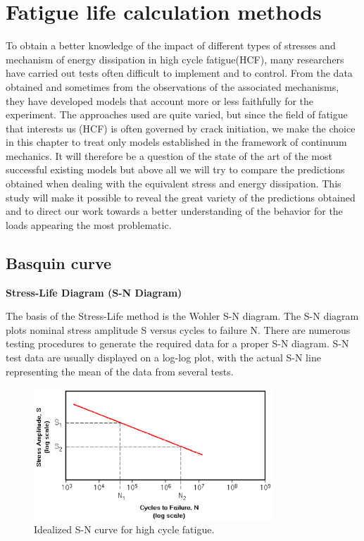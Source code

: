\chapter{Fatigue life calculation methods}\label{chp:2}
\minitoc

To obtain a better knowledge of the impact of different types of stresses and mechanism of energy dissipation in high cycle fatigue(HCF), many researchers have carried out tests often difficult to implement and to control. From the data obtained and sometimes from the observations of the associated mechanisms, they have developed models that account more or less faithfully for the experiment. The approaches used are quite varied, but since the field of fatigue that interests us (HCF) is often governed by crack initiation, we make the choice in this chapter to treat only models established in the framework of continuum mechanics. It will therefore be a question of the state of the art of the most successful existing models but above all we will try to compare the predictions obtained when dealing with the equivalent stress and energy dissipation. This study will make it possible to reveal the great variety of the predictions obtained and to direct our work towards a better understanding of the behavior for the loads appearing the most problematic.



\section{Basquin curve}

\vspace{6pt}
\textbf{Stress-Life Diagram (S-N Diagram)}
\vspace{6pt}

The basis of the Stress-Life method is the Wohler S-N diagram. The S-N diagram plots nominal stress amplitude S versus cycles to
failure N. There are numerous testing procedures to generate the required data for a proper
S-N diagram. S-N test data are usually displayed on a log-log plot, with the actual S-N line
representing the mean of the data from several tests.

\begin{figure}[h!]
	\centering
	\includegraphics[width=0.8\textwidth]{figures//basquin.png} 
	\caption{Idealized S-N curve for high cycle fatigue.}
	\label{fig.basquin}
\end{figure}

